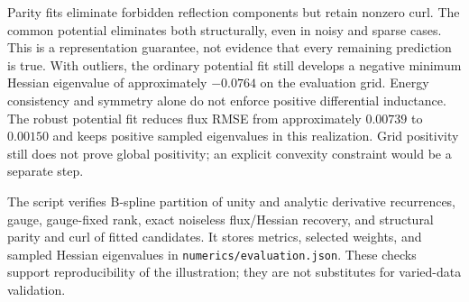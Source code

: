 Parity fits eliminate forbidden reflection components but retain nonzero
curl. The common potential eliminates both structurally, even in noisy and
sparse cases. This is a representation guarantee, not evidence that every
remaining prediction is true. With outliers, the ordinary potential fit
still develops a negative minimum Hessian eigenvalue of approximately
$-0.0764$ on the evaluation grid. Energy consistency and symmetry alone do
not enforce positive differential inductance. The robust potential fit
reduces flux RMSE from approximately $0.00739$ to $0.00150$ and keeps positive
sampled eigenvalues in this realization. Grid positivity still does not prove
global positivity; an explicit convexity constraint would be a separate step.

The script verifies B-spline partition of unity and analytic derivative
recurrences, gauge, gauge-fixed rank, exact noiseless flux/Hessian recovery,
and structural parity and curl of fitted candidates. It stores metrics,
selected weights, and sampled Hessian eigenvalues in
\texttt{numerics/evaluation.json}. 
These checks support reproducibility of
the illustration; they are not substitutes for varied-data validation.
